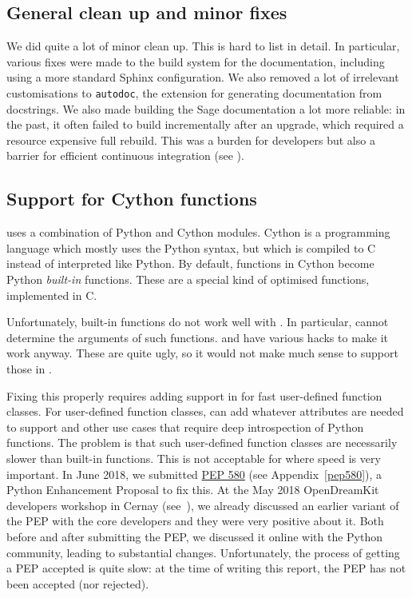 \documentclass{deliverablereport}
\begin{document}
\subsection{General clean up and minor fixes}

We did quite a lot of minor clean up.
This is hard to list in detail.
In particular, various fixes were made to the build system for the documentation,
including using a more standard Sphinx configuration.
We also removed a lot of irrelevant customisations to \texttt{autodoc},
the extension for generating documentation from docstrings.
We also made building the Sage documentation a lot more reliable:
in the past, it often failed to build incrementally after an upgrade,
which required a resource expensive full rebuild. This was a burden
for developers but also a barrier for efficient continuous integration
(see ).

\subsection{Support for Cython functions}\label{cython}

\Sage uses a combination of Python and Cython modules.
Cython is a programming language which mostly uses the Python syntax,
but which is compiled to C instead of interpreted like Python.
By default, functions in Cython become Python \emph{built-in} functions.
These are a special kind of optimised functions, implemented in C.

Unfortunately, built-in functions do not work well with \Sphinx.
In particular, \Sphinx cannot determine the arguments of such functions.
\Sage and \Cython have various hacks to make it work anyway.
These are quite ugly, so it would not make much sense to support those in \Sphinx.

Fixing this properly requires adding support in \Python
for fast user-defined function classes.
For user-defined function classes, \Cython can add whatever attributes
are needed to support \Sphinx and other use cases that require deep introspection
of Python functions.
The problem is that such user-defined function classes
are necessarily slower than built-in functions.
This is not acceptable for \Sage where speed is very important.
In June 2018, we submitted
\href{https://www.python.org/dev/peps/pep-0580/}{PEP 580} (see Appendix~\ref{pep580}), a Python Enhancement Proposal to fix this.
At the May 2018 OpenDreamKit developers workshop in Cernay
(see~),
we already discussed an earlier variant of the PEP
with the core \Cython developers and they were very positive about it.
Both before and after submitting the PEP,
we discussed it online with the Python community,
leading to substantial changes.
Unfortunately, the process of getting a PEP accepted is quite slow:
at the time of writing this report, the PEP has not been accepted (nor rejected).
\end{document}
